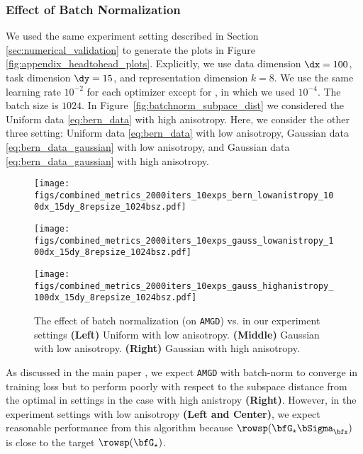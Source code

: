 \subsubsection{Effect of Batch Normalization}
We used the same experiment setting described in Section \ref{sec:numerical_validation} to generate the plots in Figure \ref{fig:appendix_headtohead_plots}. Explicitly, we use data dimension \(\dx = 100\), task dimension \(\dy = 15\), and representation dimension \(k = 8\). We use the same learning rate $10^{-2}$ for each optimizer except for \NGD, in which we used $10^{-4}$. The batch size is \(1024\). In Figure~\ref{fig:batchnorm_subpace_dist} we considered the Uniform data \eqref{eq:bern_data} with high anisotropy. Here, we consider the other three setting: Uniform data \eqref{eq:bern_data} with low anisotropy, Gaussian data \eqref{eq:bern_data_gaussian} with low anisotropy, and Gaussian data \eqref{eq:bern_data_gaussian} with high anisotropy.


\begin{figure*}[ht]
\centering
\begin{minipage}{0.32\textwidth}
    \centering
    \texttt{[image: figs/combined\_metrics\_2000iters\_10exps\_bern\_lowanistropy\_100dx\_15dy\_8repsize\_1024bsz.pdf]}
\end{minipage}%
\begin{minipage}{0.32\textwidth}
    \centering
    \texttt{[image: figs/combined\_metrics\_2000iters\_10exps\_gauss\_lowanistropy\_100dx\_15dy\_8repsize\_1024bsz.pdf]}
\end{minipage}%
\begin{minipage}{0.32\textwidth}
    \centering
    \texttt{[image: figs/combined\_metrics\_2000iters\_10exps\_gauss\_highanistropy\_100dx\_15dy\_8repsize\_1024bsz.pdf]}
\end{minipage}%
\caption{
The effect of batch normalization (on \texttt{AMGD}) vs. \KFAC in our experiment settings
\textbf{(Left)} Uniform with low anisotropy.
\textbf{(Middle)} Gaussian with low anisotropy.
\textbf{(Right)} Gaussian with high anisotropy.
}
\label{fig:batchnorm_full}
\end{figure*}


As discussed in the main paper , we expect \texttt{AMGD} with batch-norm to converge in training loss but to perform poorly with respect to the subspace distance from the optimal in settings in the case with high anistropy \textbf{(Right)}. However, in the experiment settings with low anisotropy \textbf{(Left and Center)}, we expect reasonable performance from this algorithm because $\rowsp(\bfG_\star \bSigma_{\bfx})$ is close to the target $\rowsp(\bfG_\star)$.


